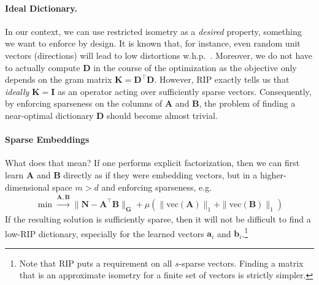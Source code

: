 \documentclass{article}
\newcommand{\valpha}{{\boldsymbol a}}
\newcommand{\vbeta}{{\boldsymbol b}}
\newcommand{\mN}{{\mathbf N}}
\newcommand{\mG}{{\mathbf G}}
\newcommand{\mK}{{\mathbf K}}
\newcommand{\mD}{{\mathbf D}}
\newcommand{\mA}{{\mathbf A}}
\newcommand{\mB}{{\mathbf B}}
\begin{document}
\paragraph{Ideal Dictionary.}

In our context, we can use restricted isometry as a \textit{desired} property, something we want to enforce by design. It is known that, for instance, even random unit vectors (directions) will lead to low distortions w.h.p.~\cite{bah2010improved}.  Moreover, we do not have to actually compute $\mD$ in the course of the optimization as the objective only depends on the gram matrix $\mK = \mD^\top \mD$.  However, RIP exactly tells us that \textit{ideally} $\mK =\mathbf I$ as an operator acting over sufficiently sparse vectors. Consequently, by enforcing sparseness on the columns of $\mA$ and $\mB$, the problem of finding a near-optimal dictionary $\mD$ should become almost trivial. 

\paragraph{Sparse Embeddings} What does that mean? If one performs explicit factorization, then we can first learn $\mA$ and $\mB$ directly as if they were embedding vectors, but in a higher-dimensional space $m>d$ and enforcing sparseness, e.g.
\begin{align}
\min \stackrel{\mA, \mB}\longrightarrow \| \mN - \mA^\top \mB\|_{\mG} + 
\mu \left( \| \text{vec}(\mA)\|_1  + \| \text{vec}(\mB)\|_1\right) 
\label{eq:l1-glove}
\end{align}
If the resulting solution is sufficiently sparse, then it will not be difficult to find a low-RIP dictionary, especially for the learned vectors $\valpha_i$ and $\vbeta_i$.\footnote{Note that RIP puts a requirement on all $s$-sparse vectors. Finding a matrix that is an approximate isometry for a finite set of vectors is strictly simpler.} 
\end{document}

